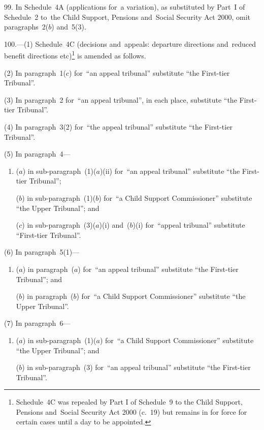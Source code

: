 \documentclass[12pt,a4paper]{article}
\begin{document}
\medskip

99.  In Schedule~4A (applications for~a variation), as substituted by Part~I of Schedule~2 to~the Child Support, Pensions and~Social Security Act 2000, omit paragraphs~2($b$)  and~5(3).

\medskip

100.---(1)  Schedule~4C (decisions and~appeals: departure directions and~reduced benefit directions etc)\footnote{Schedule~4C was repealed by Part I of Schedule~9 to the Child Support, Pensions and~Social Security Act 2000 (c.~19) but remains in for force for certain cases until a day to be appointed.} is amended as follows.

(2) In paragraph~1($c$)  for~“an appeal tribunal” substitute “the First-tier Tribunal”.

(3) In paragraph~2 for~“an appeal tribunal”, in each place, substitute “the First-tier Tribunal”.

(4) In paragraph~3(2) for~“the appeal tribunal” substitute “the First-tier Tribunal”.

(5) In paragraph~4—
\begin{enumerate}\item[]
($a$) in sub-paragraph~(1)($a$)(ii)  for~“an appeal tribunal” substitute “the First-tier Tribunal”;

($b$) in sub-paragraph~(1)($b$)  for~“a Child Support Commissioner” substitute “the Upper Tribunal”; and

($c$) in sub-paragraph~(3)($a$)(i)  and~($b$)(i)  for~“appeal tribunal” substitute “First-tier Tribunal”.
\end{enumerate}

(6) In paragraph~5(1)—
\begin{enumerate}\item[]
($a$) in paragraph~($a$)  for~“an appeal tribunal” substitute “the First-tier Tribunal”; and

($b$) in paragraph~($b$)  for~“a Child Support Commissioner” substitute “the Upper Tribunal”.
\end{enumerate}

(7) In paragraph~6—
\begin{enumerate}\item[]
($a$) in sub-paragraph~(1)($a$)  for~“a Child Support Commissioner” substitute “the Upper Tribunal”; and

($b$) in sub-paragraph~(3) for~“an appeal tribunal” substitute “the First-tier Tribunal”.
\end{enumerate}
\end{document}
